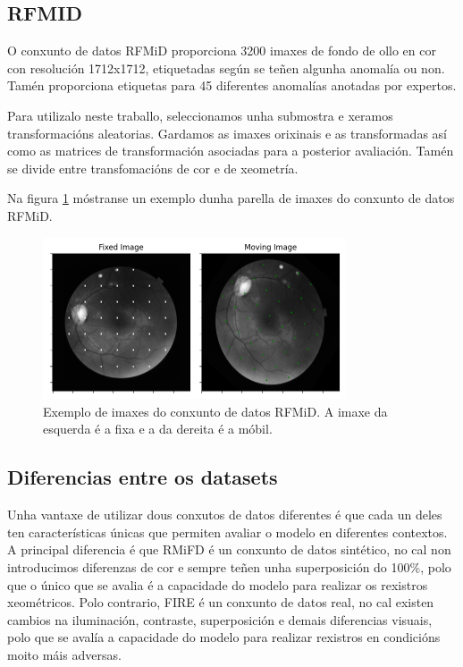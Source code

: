 \subsection{RFMID}
\label{subsec:RFMID}

O conxunto de datos RFMiD \cite{RFMiD} proporciona 3200 imaxes de fondo de ollo en cor con resolución 1712x1712, etiquetadas según se teñen algunha anomalía ou non. 
Tamén proporciona etiquetas para 45 diferentes anomalías anotadas por expertos.

Para utilizalo neste traballo, seleccionamos unha submostra e xeramos transformacións aleatorias. Gardamos as imaxes orixinais e as transformadas así como as matrices de transformación asociadas para a posterior avaliación.
Tamén se divide entre transfomacións de cor e de xeometría.

Na figura \ref{fig:rfmid_ej} móstranse un exemplo dunha parella de imaxes do conxunto de datos RFMiD.

\begin{figure}[tbp]
    \centering
    \includegraphics[width=0.8\textwidth]{imaxes/rfmid_ej.png}
    \caption{Exemplo de imaxes do conxunto de datos RFMiD. A imaxe da esquerda é a fixa e a da dereita é a móbil.}
    \label{fig:rfmid_ej}
\end{figure} 

\subsection{Diferencias entre os datasets}
\label{subsec:Diferencias entre os datasets}

Unha vantaxe de utilizar dous conxutos de datos diferentes é que cada un deles ten características únicas que permiten avaliar o modelo en diferentes contextos.
A principal diferencia é que RMiFD é un conxunto de datos sintético, no cal non introducimos diferenzas de cor e sempre teñen unha superposición do 100\%, polo que o único que se avalia é a capacidade do modelo para realizar os rexistros xeométricos.
Polo contrario, FIRE é un conxunto de datos real, no cal existen cambios na iluminación, contraste, superposición e demais diferencias visuais, polo que se avalía a capacidade do modelo para realizar rexistros en condicións moito máis adversas.


